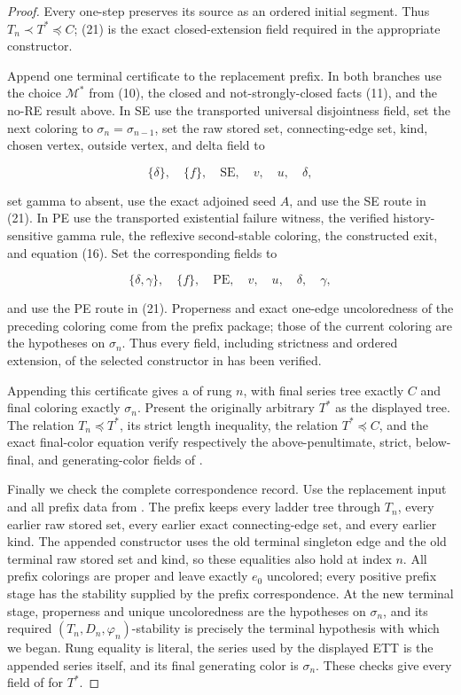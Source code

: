 \begin{proof}
Every one-step  preserves its source as
an ordered initial segment.  Thus
\(T_n\prec T^*\preccurlyeq C\); (21) is the exact closed-extension
field required in the appropriate constructor.

Append one terminal certificate to the replacement prefix.  In both
branches use the choice \(\mathcal M^*\) from (10), the closed and
not-strongly-closed facts (11), and the no-RE result above.  In SE use the
transported universal disjointness field, set the next coloring to
\(\sigma_n=\sigma_{n-1}\), set the raw stored set, connecting-edge set,
kind, chosen vertex, outside vertex, and delta field to

\[
 \{\delta\},\quad\{f\},\quad\mathrm{SE},\quad v,\quad u,
 \quad\delta,
\]

set gamma to absent, use the exact adjoined seed \(A\), and use the SE
route in (21).  In PE use the transported existential failure witness,
the verified history-sensitive gamma rule, the reflexive second-stable
coloring, the constructed exit, and equation (16).  Set the corresponding
fields to

\[
 \{\delta,\gamma\},\quad\{f\},\quad\mathrm{PE},\quad v,
 \quad u,\quad\delta,\quad\gamma,
\]

and use the PE route in (21).  Properness and exact one-edge
uncoloredness of the preceding coloring come from the prefix package;
those of the current coloring are the hypotheses on \(\sigma_n\).  Thus
every field, including strictness and ordered extension, of the selected
constructor in  has been verified.

Appending this certificate gives a  of rung
\(n\), with final series tree exactly \(C\) and final coloring exactly
\(\sigma_n\).  Present the originally arbitrary \(T^*\) as the displayed
tree.  The relation \(T_n\preccurlyeq T^*\), its strict length inequality,
the relation \(T^*\preccurlyeq C\), and the exact final-color equation
verify respectively the above-penultimate, strict, below-final, and
generating-color fields of .

Finally we check the complete correspondence record.  Use the replacement
input and all prefix data from .  The
prefix keeps every ladder tree through \(T_n\), every earlier raw stored
set, every earlier exact connecting-edge set, and every earlier kind.
The appended constructor uses the old terminal singleton edge and the old
terminal raw stored set and kind, so these equalities also hold at index
\(n\).  All prefix colorings are proper and leave exactly \(e_0\)
uncolored; every positive prefix stage has the stability supplied by the
prefix correspondence.  At the new terminal stage, properness and unique
uncoloredness are the hypotheses on \(\sigma_n\), and its required
\((T_n,D_n,\varphi_n)\)-stability is precisely the terminal hypothesis
with which we began.  Rung equality is literal, the series used by the
displayed ETT is the appended series itself, and its final generating
color is \(\sigma_n\).  These checks give every field of
 for \(T^*\).


\end{proof}
